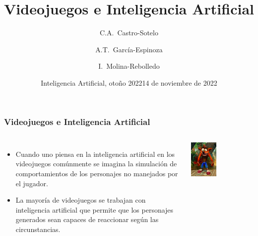\documentclass[aspectratio=169]{beamer}
\title{Videojuegos e Inteligencia Artificial}
\author[Castro-Sotelo, García-Espinoza, Molina-Rebolledo] %
{C.A.~Castro-Sotelo \and A.T.~García-Espinoza \and I.~Molina-Rebolledo}
\institute[BUAP] %
{
  Facultad de Ciencias de la Computación\\
  Benemérita Universidad Autónoma de Puebla
}
\date[Otoño 2022] %
{Inteligencia Artificial, otoño 2022}
\date{14 de noviembre de 2022}
\begin{document}
\frame{\titlepage}


\begin{frame}[fragile]
\frametitle{Videojuegos e Inteligencia Artificial}
\begin{columns}
\begin{itemize}[<+->]
\item Cuando uno piensa en la inteligencia artificial en los videojuegos
  comúnmente se imagina la simulación de comportamientos de los personajes no
  manejados por el jugador.
\item La mayoría de videojuegos se trabajan con inteligencia artificial que
  permite que los personajes generados sean capaces de reaccionar según las
  circunstancias.
\end{itemize}
\begin{center}
  \includegraphics[width=0.4\textwidth]{./images/crash.jpg}
\end{center}
\end{columns}
\end{frame}
\end{document}
